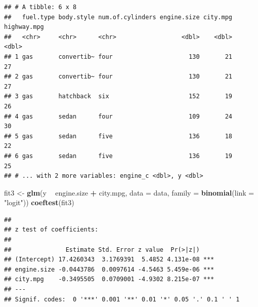 \documentclass[]{article}
\newenvironment{Shaded}{\begin{snugshade}}{\end{snugshade}}
\newcommand{\KeywordTok}[1]{\textcolor[rgb]{0.13,0.29,0.53}{\textbf{#1}}}
\newcommand{\DataTypeTok}[1]{\textcolor[rgb]{0.13,0.29,0.53}{#1}}
\newcommand{\DecValTok}[1]{\textcolor[rgb]{0.00,0.00,0.81}{#1}}
\newcommand{\StringTok}[1]{\textcolor[rgb]{0.31,0.60,0.02}{#1}}
\newcommand{\OperatorTok}[1]{\textcolor[rgb]{0.81,0.36,0.00}{\textbf{#1}}}
\newcommand{\NormalTok}[1]{#1}
\begin{document}
\begin{Shaded}
\end{Shaded}

\begin{verbatim}
## # A tibble: 6 x 8
##   fuel.type body.style num.of.cylinders engine.size city.mpg highway.mpg
##   <chr>     <chr>      <chr>                  <dbl>    <dbl>       <dbl>
## 1 gas       convertib~ four                     130       21          27
## 2 gas       convertib~ four                     130       21          27
## 3 gas       hatchback  six                      152       19          26
## 4 gas       sedan      four                     109       24          30
## 5 gas       sedan      five                     136       18          22
## 6 gas       sedan      five                     136       19          25
## # ... with 2 more variables: engine_c <dbl>, y <dbl>
\end{verbatim}

\begin{Shaded}
\begin{Highlighting}[]
\NormalTok{fit3 <-}\StringTok{ }\KeywordTok{glm}\NormalTok{(y }\OperatorTok{~}\StringTok{ }\NormalTok{engine.size }\OperatorTok{+}\StringTok{ }\NormalTok{city.mpg, }\DataTypeTok{data =}\NormalTok{ data, }\DataTypeTok{family =} \KeywordTok{binomial}\NormalTok{(}\DataTypeTok{link =} \StringTok{"logit"}\NormalTok{))}
\KeywordTok{coeftest}\NormalTok{(fit3)}
\end{Highlighting}
\end{Shaded}

\begin{verbatim}
## 
## z test of coefficients:
## 
##               Estimate Std. Error z value  Pr(>|z|)    
## (Intercept) 17.4260343  3.1769391  5.4852 4.131e-08 ***
## engine.size -0.0443786  0.0097614 -4.5463 5.459e-06 ***
## city.mpg    -0.3495505  0.0709001 -4.9302 8.215e-07 ***
## ---
## Signif. codes:  0 '***' 0.001 '**' 0.01 '*' 0.05 '.' 0.1 ' ' 1
\end{verbatim}
\end{document}
